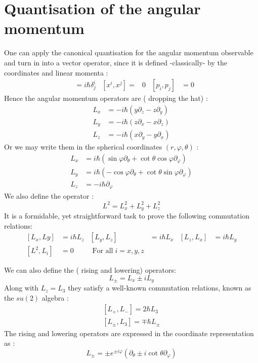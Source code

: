 \section{ Quantisation of the angular momentum}
One can apply the canonical quantisation for the angular momentum observable and turn in into a vector operator, since it is defined -classically- by the coordinates and linear momenta :
\begin{align}
[x^i, p_j]& = i\hbar \delta^i_j &  [x^i, x^j] =& 0 &  [ p_i ,p_j] &=0 
\end{align}
Hence the angular momentum operators are  ( dropping the hat) :
\begin{align}
L_x &= -i\hbar \left( y \partial_z - z\partial_y \right) \nonumber \\
L_y &= -i\hbar \left( z \partial_x - x\partial_z \right) \\
L_z &= -i\hbar \left( x \partial_y- y\partial_x\right) \nonumber 
\end{align}
Or we may write them in the spherical coordinates $(r, \varphi, \theta)$ :
\begin{align}
L_x &= i\hbar \left( \sin \varphi \partial_\theta + \cot \theta \cos \varphi \partial_\varphi \right) \nonumber \\
L_y &= i\hbar \left( -\cos \varphi \partial_\theta + \cot \theta  \sin \varphi \partial_\varphi \right) \\
L_z &= -i\hbar \partial_\varphi  \nonumber 
\end{align}
We also define the operator :
\begin{equation}
L^2 = L_x ^2+ L_y ^2+ L_z ^2
\end{equation}
It is a formidable, yet straightforward task to prove the following commutation relations:
\begin{subequations}
	\begin{align}
	[L_x,Ly]&=i\hbar L_z & [L_y,L_z]&= i\hbar L_x & [L_z,L_x]&=i\hbar L_y \\ [L^2, L_i]& =0 & \text{ For all} \;  i= x,y,z
	\end{align} 
\end{subequations}

We can also define the ( rising and lowering) operators:
\begin{equation}
L_\pm = L_x \pm i L_y
\end{equation}
Along with $L_z = L_3$ they satisfy a well-known commutation relations, known as the $su(2)$ algebra :
\begin{subequations}
	\begin{gather}
	[L_+,L_-] = 2 \hbar L_3 \\
	[ L_\pm, L_3] = \mp \hbar L_\pm 
	\end{gather}
	
\end{subequations}
The rising and lowering operators are expressed in the coordinate representation as :
\begin{equation}
L_\pm = \pm e^{\pm i \varphi}\left( \partial_\theta \pm i \cot \theta \partial_\varphi \right) 
\end{equation}
